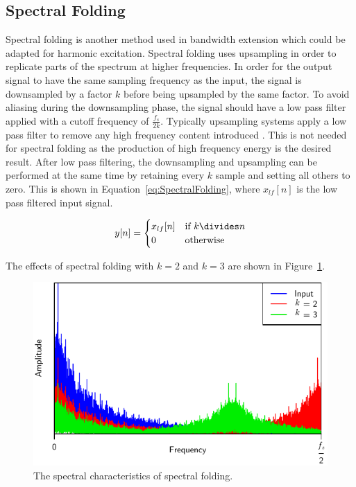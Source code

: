 	\subsection{Spectral Folding}
	\label{sec:Excitation-Methods-SpectralFolding}
		Spectral folding is another method used in bandwidth extension \citep{friedrich2007spectral} which could be
		adapted for harmonic excitation. Spectral folding uses upsampling in order to replicate parts of the
		spectrum at higher frequencies. In order for the output signal to have the same sampling frequency as the
		input, the signal is downsampled by a factor $k$ before being upsampled by the same factor. To avoid
		aliasing during the downsampling phase, the signal should have a low pass filter applied with a cutoff
		frequency of $\frac{f_{s}}{2k}$. Typically upsampling systems apply a low pass filter to remove any high
		frequency content introduced \citep{oppenheim2014discrete}. This is not needed for spectral folding as the
		production of high frequency energy is the desired result. After low pass filtering, the downsampling and
		upsampling can be performed at the same time by retaining every $k$ sample and setting all others
		to zero. This is shown in Equation~\ref{eq:SpectralFolding}, where $x_{lf}[n]$ is the low pass filtered
		input signal.

		\begin{equation}
			y[n] = \begin{cases}
				x_{lf}[n] & \text{if $k \divides n$} \\
				0 & \text{otherwise}
			\end{cases}
			\label{eq:SpectralFolding}
		\end{equation}

		The effects of spectral folding with $k = 2$ and $k = 3$ are shown in Figure~\ref{fig:SpectralFolding}.

		\begin{figure}[h!]
			\centering
			\includegraphics{chapter3/Images/SpectralFoldingSpectrum.pdf}
			\caption{The spectral characteristics of spectral folding.}
			\label{fig:SpectralFolding}
		\end{figure}

